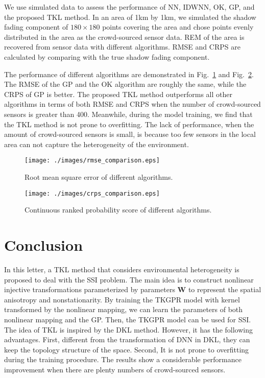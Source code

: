 \documentclass[12pt, draftclsenofoot, oneside, onecolumn]{IEEEtran}
\begin{document}
We use simulated data to assess the performance of NN, IDWNN, OK, GP, and the proposed TKL method. In an area of 1km by 1km, we simulated the shadow fading component of $180\times180$ points covering the area and chose points evenly distributed in the area as the crowd-sourced sensor data. REM of the area is recovered from sensor data with different algorithms. RMSE and CRPS are calculated by comparing with the true shadow fading component.

The performance of different algorithms are demonstrated in Fig.~\ref{fig:rmse} and Fig.~\ref{fig:crps}. The RMSE of the GP and the OK algorithm are roughly the same, while the CRPS of GP is better. The proposed TKL method outperforms all other algorithms in terms of both RMSE and CRPS when the number of crowd-sourced sensors is greater than 400. Meanwhile, during the model training, we find that the TKL method is not prone to overfitting. The lack of performance, when the amount of crowd-sourced sensors is small, is because too few sensors in the local area can not capture the heterogeneity of the environment. 

\begin{figure}[!tb]
  \centering
  \texttt{[image: ./images/rmse\_comparison.eps]}
  \caption{Root mean square error of different algorithms.}
  \label{fig:rmse}
\end{figure}

\begin{figure}[!tb]
  \centering
  \texttt{[image: ./images/crps\_comparison.eps]}
  \caption{Continuous ranked probability score of different algorithms.}
  \label{fig:crps}
\end{figure}

\section{Conclusion}
In this letter, a TKL method that considers environmental heterogeneity is proposed to deal with the SSI problem. The main idea is to construct nonlinear injective transformations parameterized by parameters $\mathbf{W}$ to represent the spatial anisotropy and nonstationarity. By training the TKGPR model with kernel transformed by the nonlinear mapping, we can learn the parameters of both nonlinear mapping and the GP. Then, the TKGPR model can be used for SSI. The idea of TKL is inspired by the DKL method. However, it has the following advantages. First, different from the transformation of DNN in DKL, they can keep the topology structure of the space.  Second, It is not prone to overfitting during the training procedure. The results show a considerable performance improvement when there are plenty numbers of crowd-sourced sensors.
\end{document}
